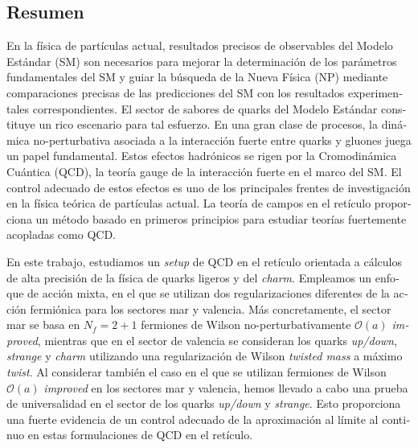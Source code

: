 \vfill

\begin{otherlanguage}{spanish}
\chapter*{Resumen}

En la física de partículas actual, resultados precisos de observables del Modelo Estándar (SM) son necesarios para mejorar la determinación de los parámetros fundamentales del SM y guiar la búsqueda de la Nueva Física (NP) mediante comparaciones precisas de las predicciones del SM con los resultados experimentales correspondientes. El sector de sabores de quarks del Modelo Estándar constituye un rico escenario para tal esfuerzo. En una gran clase de procesos, la dinámica no-perturbativa asociada a la interacción fuerte entre quarks y gluones juega un papel fundamental. Estos efectos hadrónicos se rigen por la Cromodinámica Cuántica (QCD), la teoría gauge de la interacción fuerte en el marco del SM. El control adecuado de estos efectos es uno de los principales frentes de investigación en la física teórica de partículas actual. La teoría de campos en el retículo proporciona un método basado en primeros principios para estudiar teorías fuertemente acopladas como QCD.

En este trabajo, estudiamos un \textit{setup} de QCD en el retículo orientada a cálculos de alta precisión de la física de quarks ligeros y del \textit{charm}. Empleamos un enfoque de acción mixta, en el que se utilizan dos regularizaciones diferentes de la acción fermiónica para los sectores mar y valencia. Más concretamente, el sector mar se basa en $N_f = 2 + 1$ fermiones de Wilson no-perturbativamente $\mathcal{O}(a)$ \textit{improved}, mientras que en el sector de valencia se consideran los quarks \textit{up/down}, \textit{strange} y \textit{charm} utilizando una regularización de Wilson \textit{twisted mass} a máximo \textit{twist}. Al considerar también el caso en el que se utilizan fermiones de Wilson $\mathcal{O}(a)$ \textit{improved} en los sectores mar y valencia, hemos llevado a cabo una prueba de universalidad en el sector de los quarks \textit{up/down} y \textit{strange}. Esto proporciona una fuerte evidencia de un control adecuado de la aproximación al límite al continuo en estas formulaciones de QCD en el retículo.


\end{otherlanguage}

